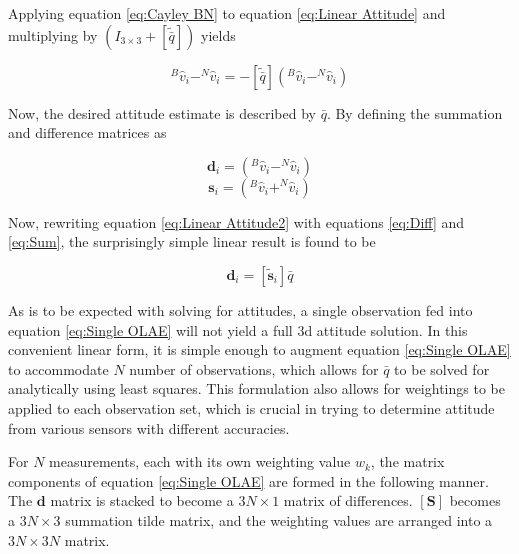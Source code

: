 \documentclass[11pt]{aiaa-tc}%
\begin{document}
Applying equation \ref{eq:Cayley BN} to equation \ref{eq:Linear Attitude} and multiplying by $(I_{3 \times 3} + [\tilde{\bar{q}}] )$ yields 

\begin{equation}
		^B\hat{v}_i - ^N\hat{v}_i	= -[\tilde{\bar{q}}] ( ^B\hat{v}_i - ^N\hat{v}_i )
		\label{eq:Linear Attitude2}
\end{equation}

Now, the desired attitude estimate is described by $\bar{q}$. By defining the summation and difference matrices as


\begin{equation}
		\textbf{d}_i=(^B\hat{v}_i - ^N\hat{v}_i)
		\label{eq:Diff}
\end{equation}
\begin{equation}
		\textbf{s}_i=(^B\hat{v}_i + ^N\hat{v}_i)
		\label{eq:Sum}
\end{equation}

Now, rewriting equation \ref{eq:Linear Attitude2} with equations \ref{eq:Diff} and \ref{eq:Sum}, the surprisingly simple linear result is found to be

\begin{equation}
		\textbf{d}_i=[\tilde{\textbf{s}}_i]\bar{q}
		\label{eq:Single OLAE}
\end{equation}

As is to be expected with solving for attitudes, a single observation fed into equation \ref{eq:Single OLAE} will not yield a full 3d attitude solution. In this convenient linear form, it is simple enough to augment equation \ref{eq:Single OLAE} to accommodate $N$ number of observations, which allows for $\bar{q}$ to be solved for analytically using least squares. This formulation also allows for weightings to be applied to each observation set, which is crucial in trying to determine attitude from various sensors with different accuracies. 

For $N$ measurements, each with its own weighting value $w_k$, the matrix components of equation \ref{eq:Single OLAE} are formed in the following manner. The $\textbf{d}$ matrix is stacked to become a $3N \times 1$ matrix of differences. $[\textbf{S}]$ becomes a $3N \times 3$ summation tilde matrix, and the weighting values are arranged into a $3N \times 3N$ matrix. 
\end{document}
